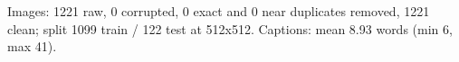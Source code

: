 Images: 1221 raw, 0 corrupted, 0 exact and 0 near duplicates removed, 1221 clean; split 1099 train / 122 test at 512x512. Captions: mean 8.93 words (min 6, max 41).